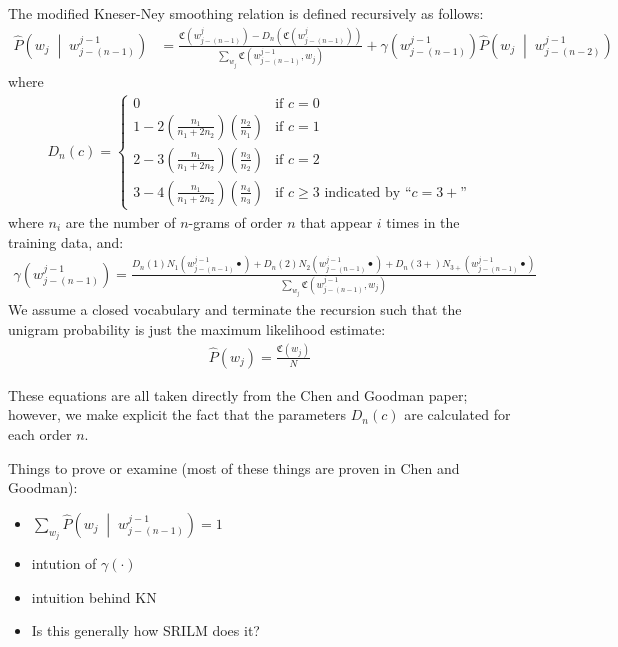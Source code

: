 \documentclass[10pt]{article}
\newcommand{\ngrams}{$n$-grams\xspace}
\newcommand{\cnt}[1]{\mathfrak{C}\left(#1\right)}
\newcommand{\hprb}[1]{\widehat{P}\left(#1\right)}
\newcommand{\hcprb}[2]{\widehat{P}\left(#1  \;\middle\vert\; #2 \right)}
\begin{document}
The modified Kneser-Ney smoothing relation is defined recursively as follows:
\begin{align}
\hcprb{w_j}{w^{j-1}_{j-(n-1)}} &= \frac{ \cnt{w^{j}_{j-(n-1)}} - D_n\left( \cnt{w^{j}_{j-(n-1)}} \right)}{ \sum_{w_j} \cnt{w^{j-1}_{j-(n-1)},w_j} } + \gamma\left( w^{j-1}_{j-(n-1)} \right) \hcprb{w_j}{w^{j-1}_{j-(n-2)}}
\end{align}
where
\begin{align}
D_n(c) =
  \begin{cases}
  0 & \text{if } c=0 \\
  1 - 2\left(\frac{n_1}{n_1+2n_2}\right)\left(\frac{n_2}{n_1}\right) & \text{if } c=1 \\
  2 - 3\left(\frac{n_1}{n_1+2n_2}\right)\left(\frac{n_3}{n_2}\right) & \text{if } c=2 \\
  3 - 4\left(\frac{n_1}{n_1+2n_2}\right)\left(\frac{n_4}{n_3}\right) & \text{if } c\geq 3 \text{ indicated by ``$c=3+$''}
  \end{cases}
\end{align}
where $n_i$ are the number of \ngrams of order $n$ that appear $i$ times in the training data, and:
\begin{align}
\gamma\left(w^{j-1}_{j-(n-1)}\right) = \frac{D_n(1)N_1\left(w^{j-1}_{j-(n-1)}\bullet\right) + D_n(2)N_2\left(w^{j-1}_{j-(n-1)}\bullet\right) + D_n(3+)N_{3+}\left(w^{j-1}_{j-(n-1)}\bullet\right)}{\sum_{w_j} \cnt{w^{j-1}_{j-(n-1)},w_j}}
\end{align}
We assume a closed vocabulary and terminate the recursion such that the unigram probability is just the maximum likelihood estimate:
\begin{align}
\hprb{w_j} = \frac{\cnt{w_j}}{N}
\end{align}

These equations are all taken directly from the Chen and Goodman paper; however, we make explicit the fact that the parameters $D_n(c)$ are calculated for each order $n$.

Things to prove or examine (most of these things are proven in Chen and Goodman):
\begin{itemize}
\item $\sum_{w_j} \hcprb{w_j}{w^{j-1}_{j-(n-1)}} = 1$
\item intution of $\gamma(\cdot)$
\item intuition behind KN
\item Is this generally how SRILM does it?
\end{itemize}

\end{document}
